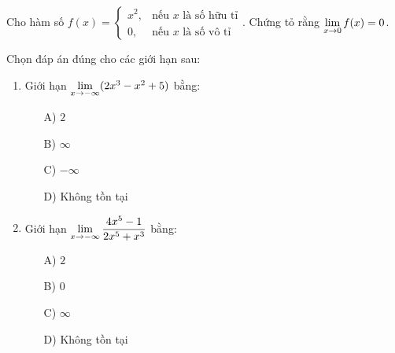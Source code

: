 \begin{exercise}
    Cho hàm số $f(x) = \begin{cases} x^2, & \text{nếu } x \text{ là số hữu tỉ} \\ 0, & \text{nếu } x \text{ là số vô tỉ} \end{cases}$.
    Chứng tỏ rằng $\lim\limits_{x \to 0} f(x) = 0$.
\end{exercise}

\begin{exercise}
    Chọn đáp án đúng cho các giới hạn sau:
    \begin{enumerate}[label=(\alph*)]
        \item Giới hạn $\lim\limits_{x \to -\infty} (2x^3 - x^2 + 5)$ bằng:
        \begin{itemize}
            \item[A)] $2$
            \item[B)] $\infty$
            \item[C)] $-\infty$
            \item[D)] Không tồn tại
        \end{itemize}
        \item Giới hạn $\lim\limits_{x \to -\infty} \dfrac{4x^5 - 1}{2x^5 + x^3}$ bằng:
        \begin{itemize}
            \item[A)] $2$
            \item[B)] $0$
            \item[C)] $\infty$
            \item[D)] Không tồn tại
        \end{itemize}
    \end{enumerate}
\end{exercise}
